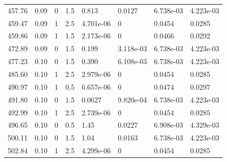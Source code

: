 \documentclass[preview]{standalone}
\begin{document}
{{{\begin{tabular}{L{1.2cm}C{1.2cm} C{0.3cm}C{0.5cm} C{1.4cm}C{1.4cm} C{1.4cm}C{1.4cm}}
  457.76  &  0.09  & 0     & 1.5 &  0.813  & 0.0127  & 6.738e-03 &  4.223e-03   \\ 
  459.47  &  0.09  & 1     & 2.5 &  4.701e-06  & 0  & 0.0454 &  0.0285   \\ 
  459.86  &  0.09  & 1     & 1.5 &  2.173e-06  & 0  & 0.0466 &  0.0292   \\ 
  472.89  &  0.09  & 0     & 1.5 &  0.199  & 3.118e-03  & 6.738e-03 &  4.223e-03   \\ 
  477.23  &  0.10  & 0     & 1.5 &  0.390  & 6.108e-03  & 6.738e-03 &  4.223e-03   \\ 
  485.60  &  0.10  & 1     & 2.5 &  2.979e-06  & 0  & 0.0454 &  0.0285   \\ 
  490.97  &  0.10  & 1     & 0.5 &  6.657e-06  & 0  & 0.0474 &  0.0297   \\ 
  491.80  &  0.10  & 0     & 1.5 &  0.0627  & 9.820e-04  & 6.738e-03 &  4.223e-03   \\ 
  492.99  &  0.10  & 1     & 2.5 &  2.739e-06  & 0  & 0.0454 &  0.0285   \\ 
  496.65  &  0.10  & 0     & 0.5 &  1.45  & 0.0227  & 6.908e-03 &  4.329e-03   \\ 
  500.11  &  0.10  & 0     & 1.5 &  1.04  & 0.0163  & 6.738e-03 &  4.223e-03   \\ 
  502.84  &  0.10  & 1     & 2.5 &  4.299e-06  & 0  & 0.0454 &  0.0285   \\ 
\hline 
\end{tabular} 

}}}
\end{document}
